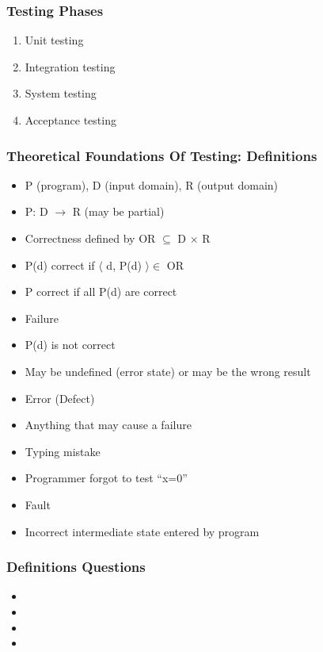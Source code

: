 \documentclass[t,12pt,numbers,fleqn]{beamer}
\begin{document}

\begin{frame}
\frametitle{Testing Phases}
\begin{enumerate}
\item Unit testing
\item Integration testing
\item System testing
\item Acceptance testing
\end{enumerate}
\end{frame}


\begin{frame}
\frametitle{Theoretical Foundations Of Testing: Definitions}
\begin{itemize}
\item P (program), D (input domain), R (output domain)
\bi
\item P: D $\rightarrow$ R (may be partial)
\ei
\item Correctness defined by OR $\subseteq$ D $\times$ R
\bi
\item P(d) correct if $\langle$ d, P(d) $\rangle \in$ OR
\item P correct if all P(d) are correct
\ei
\item Failure
\bi
\item P(d) is not correct
\item May be undefined (error state) or may be the wrong result
\ei
\item Error (Defect)
\bi
\item Anything that may cause a failure
\bi
\item Typing mistake
\item Programmer forgot to test ``x=0''
\ei
\ei
\item Fault
\bi
\item Incorrect intermediate state entered by program
\ei
\end{itemize}
\end{frame}


\begin{frame}
\frametitle{Definitions Questions}
\begin{itemize}
\item {}
\item {}
\item {}
\item {}
\end{itemize}
\end{frame}
\end{document}
